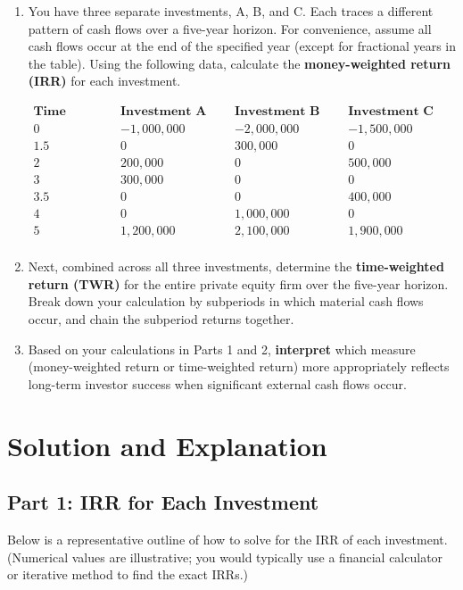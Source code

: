 \begin{enumerate}
\item You have three separate investments, A, B, and C. Each traces a different pattern of cash flows over a five-year horizon. For convenience, assume all cash flows occur at the end of the specified year (except for fractional years in the table). Using the following data, calculate the \textbf{money-weighted return (IRR)} for each investment.

\[
\begin{array}{c|c|c|c}
\textbf{Time (years)} & \textbf{Investment A (\$)} & \textbf{Investment B (\$)} & \textbf{Investment C (\$)} \\
\hline
0 & -1{,}000{,}000 & -2{,}000{,}000 & -1{,}500{,}000 \\
1.5 & 0 & 300{,}000 & 0 \\
2 & 200{,}000 & 0 & 500{,}000 \\
3 & 300{,}000 & 0 & 0 \\
3.5 & 0 & 0 & 400{,}000 \\
4 & 0 & 1{,}000{,}000 & 0 \\
5 & 1{,}200{,}000 & 2{,}100{,}000 & 1{,}900{,}000 \\
\end{array}
\]

\item Next, combined across all three investments, determine the \textbf{time-weighted return (TWR)} for the entire private equity firm over the five-year horizon. Break down your calculation by subperiods in which material cash flows occur, and chain the subperiod returns together.

\item Based on your calculations in Parts 1 and 2, \textbf{interpret} which measure (money-weighted return or time-weighted return) more appropriately reflects long-term investor success when significant external cash flows occur.
\end{enumerate}

\section*{Solution and Explanation}

\subsection*{Part 1: IRR for Each Investment}
Below is a representative outline of how to solve for the IRR of each investment. (Numerical values are illustrative; you would typically use a financial calculator or iterative method to find the exact IRRs.)

